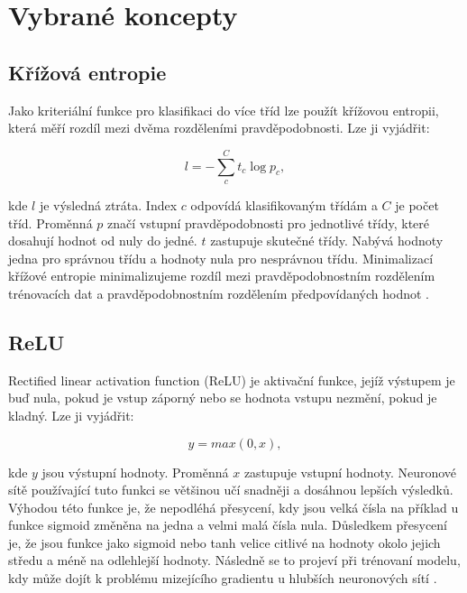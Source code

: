 \documentclass[FM,BP]{tulthesis}
\begin{document}
\section{Vybrané koncepty}

\subsection{Křížová entropie} %
Jako kriteriální funkce pro klasifikaci do více tříd lze použít křížovou entropii, která měří rozdíl mezi dvěma rozděleními pravděpodobnosti. Lze ji vyjádřit:

\begin{equation}
\label{eqn:cross_entropy}
l = -{\sum_{c}^{C}t_{c}\log p_{c}},
\end{equation}

kde $ l $ je výsledná ztráta. Index $ c $ odpovídá klasifikovaným třídám a $ C $ je počet tříd. Proměnná $ p $ značí vstupní pravděpodobnosti pro jednotlivé třídy, které dosahují hodnot od nuly do jedné. $ t $ zastupuje skutečné třídy. Nabývá hodnoty jedna pro správnou třídu a hodnoty nula pro nesprávnou třídu. Minimalizací křížové entropie minimalizujeme rozdíl mezi pravděpodobnostním rozdělením trénovacích dat a pravděpodobnostním rozdělením předpovídaných hodnot \cite{brownlee_2020}.

\subsection{ReLU} %
Rectified linear activation function (ReLU) je aktivační funkce, jejíž výstupem je buď nula, pokud je vstup záporný nebo se hodnota vstupu nezmění, pokud je kladný. Lze ji vyjádřit:

\begin{equation}
\label{eqn:relu}
y = max(0, x),
\end{equation}

kde $ y $ jsou výstupní hodnoty. Proměnná $ x $ zastupuje vstupní hodnoty. Neuronové sítě používající tuto funkci se většinou učí snadněji a dosáhnou lepších výsledků. Výhodou této funkce je, že nepodléhá přesycení, kdy jsou velká čísla na příklad u funkce sigmoid změněna na jedna a velmi malá čísla nula. Důsledkem přesycení je, že jsou funkce jako sigmoid nebo tanh velice citlivé na hodnoty okolo jejich středu a méně na odlehlejší hodnoty. Následně se to projeví při trénovaní modelu, kdy může dojít k problému mizejícího gradientu u hlubších neuronových sítí \cite{brownlee_2020_ReLU}.
\end{document}
